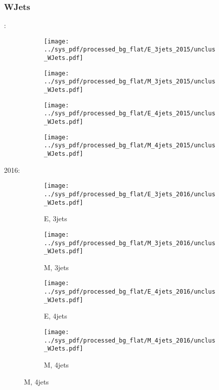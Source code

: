 \documentclass{beamer}
\begin{document}
\begin{frame}
\frametitle{WJets}
\fontsize{5}{1}:
\begin{figure}
\centering
\begin{subfigure}[b]{0.24\textwidth}
\texttt{[image: ../sys\_pdf/processed\_bg\_flat/E\_3jets\_2015/unclus\_WJets.pdf]}
\end{subfigure}
\begin{subfigure}[b]{0.24\textwidth}
\texttt{[image: ../sys\_pdf/processed\_bg\_flat/M\_3jets\_2015/unclus\_WJets.pdf]}
\end{subfigure}
\begin{subfigure}[b]{0.24\textwidth}
\texttt{[image: ../sys\_pdf/processed\_bg\_flat/E\_4jets\_2015/unclus\_WJets.pdf]}
\end{subfigure}
\begin{subfigure}[b]{0.24\textwidth}
\texttt{[image: ../sys\_pdf/processed\_bg\_flat/M\_4jets\_2015/unclus\_WJets.pdf]}
\end{subfigure}
\end{figure}
2016:
\begin{figure}
\centering
\begin{subfigure}[b]{0.24\textwidth}
\texttt{[image: ../sys\_pdf/processed\_bg\_flat/E\_3jets\_2016/unclus\_WJets.pdf]}
\captionsetup{font=tiny}
\caption{E, 3jets}
\end{subfigure}
\begin{subfigure}[b]{0.24\textwidth}
\texttt{[image: ../sys\_pdf/processed\_bg\_flat/M\_3jets\_2016/unclus\_WJets.pdf]}
\captionsetup{font=tiny}
\caption{M, 3jets}
\end{subfigure}
\begin{subfigure}[b]{0.24\textwidth}
\texttt{[image: ../sys\_pdf/processed\_bg\_flat/E\_4jets\_2016/unclus\_WJets.pdf]}
\captionsetup{font=tiny}
\caption{E, 4jets}
\end{subfigure}
\begin{subfigure}[b]{0.24\textwidth}
\texttt{[image: ../sys\_pdf/processed\_bg\_flat/M\_4jets\_2016/unclus\_WJets.pdf]}
\captionsetup{font=tiny}
\caption{M, 4jets}
\end{subfigure}
\end{figure}
\end{frame}
\end{document}
